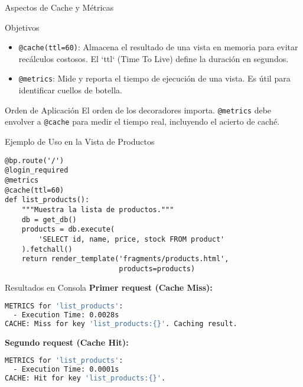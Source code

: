 \documentclass[spanish]{beamer}
\begin{document}
\begin{frame}{Aspectos de Cache y Métricas}
    \begin{block}{Objetivos}
        \begin{itemize}
            \item \texttt{@cache(ttl=60)}: Almacena el resultado de una vista en memoria para evitar recálculos costosos. El `ttl` (Time To Live) define la duración en segundos.
            \item \texttt{@metrics}: Mide y reporta el tiempo de ejecución de una vista. Es útil para identificar cuellos de botella.
        \end{itemize}
    \end{block}
    
    \begin{alertblock}{Orden de Aplicación}
        El orden de los decoradores importa. \texttt{@metrics} debe envolver a \texttt{@cache} para medir el tiempo real, incluyendo el acierto de caché.
    \end{alertblock}
\end{frame}

\begin{frame}[fragile]{Ejemplo de Uso en la Vista de Productos}
    \begin{lstlisting}
@bp.route('/')
@login_required
@metrics
@cache(ttl=60)
def list_products():
    """Muestra la lista de productos."""
    db = get_db()
    products = db.execute(
        'SELECT id, name, price, stock FROM product'
    ).fetchall()
    return render_template('fragments/products.html', 
                           products=products)
    \end{lstlisting}
\end{frame}

\begin{frame}[fragile]{Resultados en Consola}
    \textbf{Primer request (Cache Miss):}
    \begin{lstlisting}[language=bash]
METRICS for 'list_products':
  - Execution Time: 0.0028s
CACHE: Miss for key 'list_products:{}'. Caching result.
    \end{lstlisting}
    
    \vfill
    
    \textbf{Segundo request (Cache Hit):}
    \begin{lstlisting}[language=bash]
METRICS for 'list_products':
  - Execution Time: 0.0001s
CACHE: Hit for key 'list_products:{}'.
    \end{lstlisting}
\end{frame}
\end{document}

